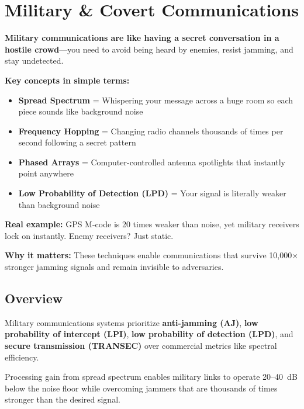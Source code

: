 \chapter{Military \& Covert Communications}
\label{ch:military-covert}

\begin{nontechnical}
\textbf{Military communications are like having a secret conversation in a hostile crowd}---you need to avoid being heard by enemies, resist jamming, and stay undetected.

\textbf{Key concepts in simple terms:}
\begin{itemize}
\item \textbf{Spread Spectrum} = Whispering your message across a huge room so each piece sounds like background noise
\item \textbf{Frequency Hopping} = Changing radio channels thousands of times per second following a secret pattern
\item \textbf{Phased Arrays} = Computer-controlled antenna spotlights that instantly point anywhere
\item \textbf{Low Probability of Detection (LPD)} = Your signal is literally weaker than background noise
\end{itemize}

\textbf{Real example:} GPS M-code is 20 times weaker than noise, yet military receivers lock on instantly. Enemy receivers? Just static.

\textbf{Why it matters:} These techniques enable communications that survive 10,000× stronger jamming signals and remain invisible to adversaries.
\end{nontechnical}

\section{Overview}

Military communications systems prioritize \textbf{anti-jamming (AJ)}, \textbf{low probability of intercept (LPI)}, \textbf{low probability of detection (LPD)}, and \textbf{secure transmission (TRANSEC)} over commercial metrics like spectral efficiency.

\begin{keyconcept}
Processing gain from spread spectrum enables military links to operate 20--40~dB below the noise floor while overcoming jammers that are thousands of times stronger than the desired signal.
\end{keyconcept}

